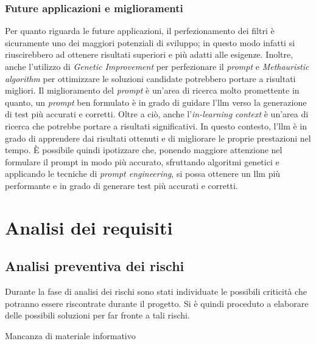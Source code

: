     \subsubsection{Future applicazioni e miglioramenti} 
        Per quanto riguarda le future applicazioni,
        il perfezionamento dei filtri è sicuramente uno dei maggiori potenziali di sviluppo; in questo modo infatti si riuscirebbero ad ottenere risultati superiori e più adatti alle esigenze.
        Inoltre, anche l'utilizzo di \textit{Genetic Improvement} per perfezionare il \textit{prompt} e \textit{Methauristic algorithm} per ottimizzare le soluzioni candidate potrebbero portare a risultati migliori.
        Il miglioramento del \textit{prompt} è un'area di ricerca molto promettente in quanto, un \textit{prompt} ben formulato è in grado di guidare l'\gls{llm} verso la generazione di test più accurati e corretti. Oltre a ciò, anche l'\textit{in-learning context} è un'area di ricerca che potrebbe portare a risultati significativi. In questo contesto, l'\gls{llm} è in grado di apprendere dai risultati ottenuti e di migliorare le proprie prestazioni nel tempo.
        È possibile quindi ipotizzare che, ponendo maggiore attenzione nel formulare il prompt in modo più accurato, sfruttando algoritmi genetici e applicando le tecniche di \textit{prompt engineering}, si possa ottenere un \gls{llm} più performante e in grado di generare test più accurati e corretti.
\section{Analisi dei requisiti}
    \subsection{Analisi preventiva dei rischi}
    Durante la fase di analisi dei rischi sono stati individuate le possibili criticità che potranno essere riscontrate durante il progetto.
    Si è quindi proceduto a elaborare delle possibili soluzioni per far fronte a tali rischi.

    \begin{risk}{Mancanza di materiale informativo}
        \label{risk:data-absence} 
    \end{risk}

